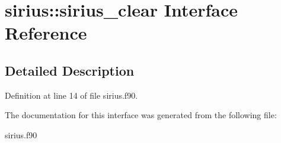 \hypertarget{interfacesirius_1_1sirius__clear}{}\section{sirius\+:\+:sirius\+\_\+clear Interface Reference}
\label{interfacesirius_1_1sirius__clear}


\subsection{Detailed Description}


Definition at line 14 of file sirius.\+f90.



The documentation for this interface was generated from the following file\+:\begin{DoxyCompactItemize}
\item 
sirius.\+f90\end{DoxyCompactItemize}

